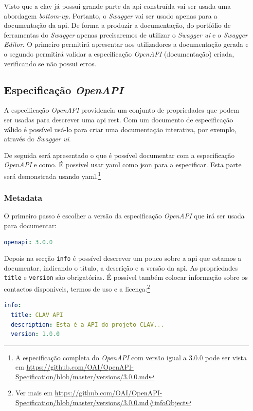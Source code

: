 Visto que a \acrshort{clav} já possui grande parte da \acrshort{api} construída vai ser usada uma abordagem \textit{bottom-up}. Portanto, o \textit{Swagger} vai ser usado apenas para a documentação da \acrshort{api}. De forma a produzir a documentação, do portfólio de ferramentas do \textit{Swagger} apenas precisaremos de utilizar o \textit{Swagger \acrshort{ui}} e o \textit{Swagger Editor}. O primeiro permitirá apresentar aos utilizadores a documentação gerada e o segundo permitirá validar a especificação \textit{OpenAPI} (documentação) criada, verificando se não possui erros.

\subsection{Especificação \textit{OpenAPI}}

A especificação \textit{OpenAPI} providencia um conjunto de propriedades que podem ser usadas para descrever uma \acrshort{api} \acrshort{rest}. Com um documento de especificação válido é possível usá-lo para criar uma documentação interativa, por exemplo, através do \textit{Swagger \acrshort{ui}}.

De seguida será apresentado o que é possível documentar com a especificação \textit{OpenAPI} e como. É possível usar \acrshort{yaml} como \acrshort{json} para a especificar. Esta parte será demonstrada usando \acrshort{yaml}.\footnote{A especificação completa do \textit{OpenAPI} com versão igual a 3.0.0 pode ser vista em \url{https://github.com/OAI/OpenAPI-Specification/blob/master/versions/3.0.0.md}}

\subsubsection{Metadata}
O primeiro passo é escolher a versão da especificação \textit{OpenAPI} que irá ser usada para documentar:
\begin{lstlisting}[language=yaml, caption=Exemplo de indicação da versão da especificação \textit{OpenAPI}]
openapi: 3.0.0
\end{lstlisting}

Depois na secção \texttt{info} é possível descrever um pouco sobre a \acrshort{api} que estamos a documentar, indicando o título, a descrição e a versão da \acrshort{api}. As propriedades \texttt{title} e \texttt{version} são obrigatórias. É possível também colocar informação sobre os contactos disponíveis, termos de uso e a licença:\footnote{Ver mais em \url{https://github.com/OAI/OpenAPI-Specification/blob/master/versions/3.0.0.md\#infoObject}}
\begin{lstlisting}[language=yaml, caption={Exemplo de secção \texttt{info} indicando título, descrição e versão da \acrshort{api} na especificação \textit{OpenAPI}}]
info:
  title: CLAV API
  description: Esta é a API do projeto CLAV...
  version: 1.0.0
\end{lstlisting}

